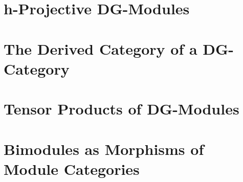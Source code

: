 \section{h-Projective DG-Modules}


\section{The Derived Category of a DG-Category}


\section{Tensor Products of DG-Modules}


\section{Bimodules as Morphisms of Module Categories}

